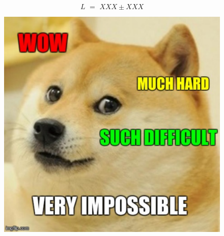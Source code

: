 \begin{equation*}
	L \,\,=\,\, XXX \pm XXX
\end{equation*}

\begin{figure}[hbtp]
        \centering
        \includegraphics[scale=0.43]{doge.pdf}
\end{figure}